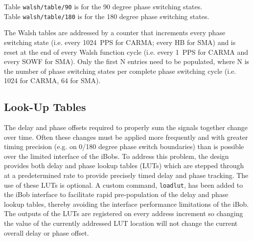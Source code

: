 \documentclass[12pt]{article}
\begin{document}
\begin{description}
Table \verb|walsh/table/90| is for the 90 degree phase switching states.\\
Table \verb|walsh/table/180| is for the 180 degree phase switching states.

The Walsh tables are addressed by a counter that increments every phase
switching state (i.e. every 1024~PPS for CARMA; every HB for SMA) and is reset
at the end of every Walsh function cycle (i.e.  every 1~PPS for CARMA and every
SOWF for SMA).  Only the first N entries need to be populated, where N is the
number of phase switching states per complete phase switching cycle (i.e. 1024
for CARMA, 64 for SMA).

\end{description}

  \subsection{Look-Up Tables}

The delay and phase offsets required to properly sum the signals together
change over time.  Often these changes must be applied more frequently and with
greater timing precision (e.g. on 0/180 degree phase switch boundaries) than is
possible over the limited interface of the iBobs.  To address this problem, the
design provides both delay and phase lookup tables (LUTs) which are stepped
through at a predetermined rate to provide precisely timed delay and phase
tracking.  The use of these LUTs is optional.  A custom command,
\verb|loadlut|, has been added to the iBob interface to facilitate rapid
pre-population of the delay and phase lookup tables, thereby avoiding the
interface performance limitations of the iBob.  The outputs of the LUTs are
registered on every address increment so changing the value of the currently
addressed LUT location will not change the current overall delay or phase
offset.
\end{document}
